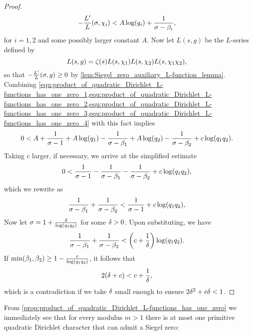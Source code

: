 \begin{proof}
        \begin{equation}\label{equ:product_of_quadratic_Dirichlet_L-functions_has_one_zero_4}
          -\frac{L'}{L}(\sigma,\chi_{i}) < A\log(q_{i})+\frac{1}{\sigma-\beta_{i}},
        \end{equation}
        for $i = 1,2$ and some possibly larger constant $A$. Now let $L(s,g)$ be the $L$-series defined by
        \[
          L(s,g) = \zeta(s)L(s,\chi_{1})L(s,\chi_{2})L(s,\chi_{1}\chi_{2}),
        \]
        so that $-\frac{L'}{L}(\sigma,g) \ge 0$ by \cref{lem:Siegel_zero_auxiliary_L-function_lemma}. Combining \cref{equ:product_of_quadratic_Dirichlet_L-functions_has_one_zero_1,equ:product_of_quadratic_Dirichlet_L-functions_has_one_zero_2,equ:product_of_quadratic_Dirichlet_L-functions_has_one_zero_3,equ:product_of_quadratic_Dirichlet_L-functions_has_one_zero_4} with this fact implies
        \[
         0 < A+\frac{1}{\sigma-1}+A\log(q_{1})-\frac{1}{\sigma-\beta_{1}}+A\log(q_{2})-\frac{1}{\sigma-\beta_{2}}+c\log(q_{1}q_{2}).
        \]
        Taking $c$ larger, if necessary, we arrive at the simplified estimate
        \[
          0 < \frac{1}{\sigma-1}-\frac{1}{\sigma-\beta_{1}}-\frac{1}{\sigma-\beta_{2}}+c\log(q_{1}q_{2}),
        \]
        which we rewrite as
        \[
          \frac{1}{\sigma-\beta_{1}}+\frac{1}{\sigma-\beta_{2}} < \frac{1}{\sigma-1}+c\log(q_{1}q_{2}),
        \]
        Now let $\sigma = 1+\frac{\delta}{\log(q_{1}q_{2})}$ for some $\delta > 0$. Upon substituting, we have
        \[
          \frac{1}{\sigma-\beta_{1}}+\frac{1}{\sigma-\beta_{2}} < \left(c+\frac{1}{\delta}\right)\log(q_{1}q_{2}).
        \]
        If $\min(\beta_{1},\beta_{2}) \ge 1-\frac{c}{\log(q_{1}q_{2})}$, it follows that
        \[
          2(\delta+c) < c+\frac{1}{\delta},
        \]
        which is a contradiction if we take $\delta$ small enough to ensure $2\delta^{2}+c\delta < 1$.
      \end{proof}
    
      From \cref{prop:product_of_quadratic_Dirichlet_L-functions_has_one_zero} we immediately see that for every modulus $m > 1$ there is at most one primitive quadratic Dirichlet character that can admit a Siegel zero:

